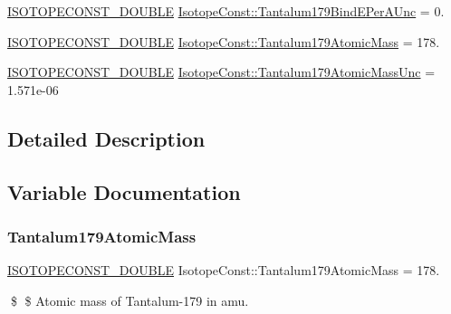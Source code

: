 \begin{DoxyCompactItemize}
\mbox{\hyperlink{group___isotope_const-_macros_ga8f45a7272ce02c0b4c65c44636ed719a}{I\+S\+O\+T\+O\+P\+E\+C\+O\+N\+S\+T\+\_\+\+D\+O\+U\+B\+LE}} \mbox{\hyperlink{group___isotope_const-_tantalum-_ta179_gafcf29659974fbe696f2d920fe7c997d2}{Isotope\+Const\+::\+Tantalum179\+Bind\+E\+Per\+A\+Unc}} = 0.
\item 
\mbox{\hyperlink{group___isotope_const-_macros_ga8f45a7272ce02c0b4c65c44636ed719a}{I\+S\+O\+T\+O\+P\+E\+C\+O\+N\+S\+T\+\_\+\+D\+O\+U\+B\+LE}} \mbox{\hyperlink{group___isotope_const-_tantalum-_ta179_gacebf5063b487cde14f3c455d9c9c7137}{Isotope\+Const\+::\+Tantalum179\+Atomic\+Mass}} = 178.
\item 
\mbox{\hyperlink{group___isotope_const-_macros_ga8f45a7272ce02c0b4c65c44636ed719a}{I\+S\+O\+T\+O\+P\+E\+C\+O\+N\+S\+T\+\_\+\+D\+O\+U\+B\+LE}} \mbox{\hyperlink{group___isotope_const-_tantalum-_ta179_ga566e2f565a3ecd5125df50bc5fc8a5c3}{Isotope\+Const\+::\+Tantalum179\+Atomic\+Mass\+Unc}} = 1.\+571e-\/06
\end{DoxyCompactItemize}


\subsection{Detailed Description}


\subsection{Variable Documentation}
\mbox{\label{group___isotope_const-_tantalum-_ta179_gacebf5063b487cde14f3c455d9c9c7137}} 
\subsubsection{\texorpdfstring{Tantalum179\+Atomic\+Mass}{Tantalum179AtomicMass}}
{\footnotesize\ttfamily \mbox{\hyperlink{group___isotope_const-_macros_ga8f45a7272ce02c0b4c65c44636ed719a}{I\+S\+O\+T\+O\+P\+E\+C\+O\+N\+S\+T\+\_\+\+D\+O\+U\+B\+LE}} Isotope\+Const\+::\+Tantalum179\+Atomic\+Mass = 178.}

\$ \$ Atomic mass of Tantalum-\/179 in amu. \mbox{\label{group___isotope_const-_tantalum-_ta179_ga566e2f565a3ecd5125df50bc5fc8a5c3}} 
